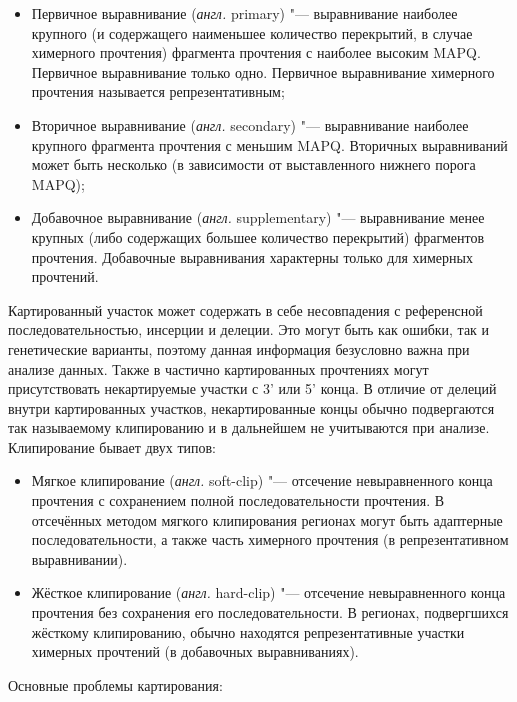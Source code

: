 \documentclass[a4paper,12pt]{article}
\begin{document}
\begin{itemize}
\item Первичное выравнивание (\textit{англ.} primary) "--- выравнивание наиболее крупного (и содержащего наименьшее количество перекрытий, в случае химерного прочтения) фрагмента прочтения с наиболее высоким MAPQ.
Первичное выравнивание только одно.
Первичное выравнивание химерного прочтения называется репрезентативным;
\item Вторичное выравнивание (\textit{англ.} secondary) "--- выравнивание наиболее крупного фрагмента прочтения с меньшим MAPQ.
Вторичных выравниваний может быть несколько (в зависимости от выставленного нижнего порога MAPQ);
\item Добавочное выравнивание (\textit{англ.} supplementary) "--- выравнивание менее крупных (либо содержащих большее количество перекрытий) фрагментов прочтения.
Добавочные выравнивания характерны только для химерных прочтений.
\end{itemize}

Картированный участок может содержать в себе несовпадения с референсной последовательностью, инсерции и делеции.
Это могут быть как ошибки, так и генетические варианты, поэтому данная информация безусловно важна при анализе данных.
Также в частично картированных прочтениях могут присутствовать некартируемые участки с 3' или 5' конца.
В отличие от делеций внутри картированных участков, некартированные концы обычно подвергаются так называемому клипированию и в дальнейшем не учитываются при анализе.
Клипирование бывает двух типов:

\begin{itemize}
\item Мягкое клипирование (\textit{англ.} soft-clip) "--- отсечение невыравненного конца прочтения с сохранением полной последовательности прочтения.
В отсечённых методом мягкого клипирования регионах могут быть адаптерные последовательности, а также часть химерного прочтения (в репрезентативном выравнивании).
\item Жёсткое клипирование (\textit{англ.} hard-clip) "--- отсечение невыравненного конца прочтения без сохранения его последовательности.
В регионах, подвергшихся жёсткому клипированию, обычно находятся репрезентативные участки химерных прочтений (в добавочных выравниваниях).
\end{itemize}

Основные проблемы картирования:
\end{document}
